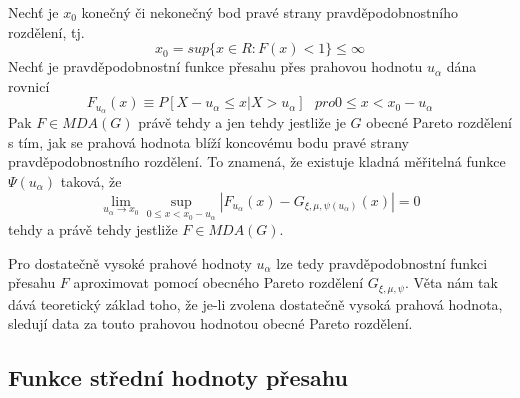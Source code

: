 \begin{theorem}
Nechť je $x_0$ konečný či nekonečný bod pravé strany pravděpodobnostního rozdělení, tj.
\begin{equation}
x_0 = sup\{x \in R:F(x) < 1\} \le \infty
\end{equation}
Nechť je pravděpodobnostní funkce přesahu přes prahovou hodnotu $u_{\alpha}$ dána rovnicí
\begin{equation}
F_{u_{\alpha}}(x) \equiv P[X - u_{\alpha} \le x | X > u_{\alpha}] ~~~ pro 0 \le x < x_0 - u_{\alpha}
\end{equation}
Pak $F \in MDA(G)$ právě tehdy a jen tehdy jestliže je $G$ obecné Pareto rozdělení s tím, jak se prahová hodnota blíží koncovému bodu pravé strany pravděpodobnostního rozdělení. To znamená, že existuje kladná měřitelná funkce $\Psi(u_{\alpha})$ taková, že
\begin{equation}
\lim_{u_{\alpha} \rightarrow x_0} \sup_{0 \le x < x_0 - u_{\alpha}}|F_{u_{\alpha}}(x) - G_{\xi, \mu, \psi(u_\alpha)}(x)| = 0
\end{equation}
tehdy a právě tehdy jestliže $F \in MDA(G)$.
\end{theorem}
Pro dostatečně vysoké prahové hodnoty $u_{\alpha}$ lze tedy pravděpodobnostní funkci přesahu $F$ aproximovat pomocí obecného Pareto rozdělení $G_{\xi, \mu, \psi}$. Věta nám tak dává teoretický základ toho, že je-li zvolena dostatečně vysoká prahová hodnota, sledují data za touto prahovou hodnotou obecné Pareto rozdělení.

\subsection{Funkce střední hodnoty přesahu}

